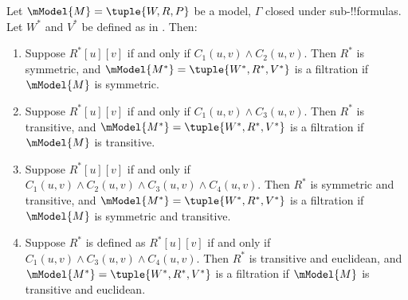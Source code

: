 \documentclass[../../../include/open-logic-section]{subfiles}
\begin{document}
\begin{thm}
  Let $\mModel{M} =\tuple{W,R,P}$ be a model, $\Gamma$ closed under
  sub-!!{formula}s. Let $W^*$ and $V^*$ be defined as in
  . Then:
  \begin{enumerate}
  \item Suppose $R^*[u][v]$ if and only if $C_1(u, v) \land
    C_2(u,v)$. Then $R^*$ is symmetric, and $\mModel{M^*} =
    \tuple{W^*,R^*,V^*}$ is a filtration if $\mModel{M}$ is symmetric.
  \item Suppose $R^*[u][v]$ if and only if $C_1(u, v)
    \land C_3(u,v)$. Then $R^*$ is transitive, and
    $\mModel{M^*}=\tuple{W^*,R^*,V^*}$ is a filtration if $\mModel{M}$
    is transitive.
  \item Suppose $R^*[u][v]$ if and only if $C_1(u, v) \land C_2(u,v)
    \land C_3(u,v) \land C_4(u,v)$. Then $R^*$ is symmetric and
    transitive, and $\mModel{M^*}=\tuple{W^*,R^*,V^*}$ is a filtration
    if $\mModel{M}$ is symmetric and transitive.
  \item Suppose $R^*$ is defined as $R^*[u][v]$ if and only if $C_1(u,
    v) \land C_3(u,v) \land C_4(u,v)$. Then $R^*$ is transitive and
    euclidean, and $\mModel{M^*}=\tuple{W^*,R^*,V^*}$ is a filtration
    if $\mModel{M}$ is transitive and euclidean.
  \end{enumerate}
\end{thm}
\end{document}
